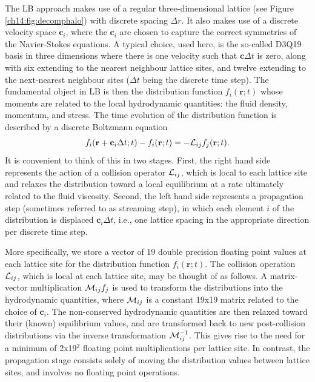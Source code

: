 The LB approach makes use of a regular three-dimensional
lattice (see Figure \ref{ch14:fig:decomphalo}) with discrete spacing
$\Delta r$. It also makes use of a
discrete velocity space $\mathbf{c}_i$, where the $\mathbf{c}_i$
are chosen to capture the correct symmetries of the Navier-Stokes
equations. A typical choice, used here, is the so-called D3Q19
basis in three dimensions where there is one velocity such that
$\mathbf{c} \Delta t$ is zero, along with six extending to the nearest
neighbour
lattice sites, and twelve extending to the next-nearest neighbour sites
($\Delta t$ being the discrete time step). The fundamental object
in LB is then the distribution function $f_i (\mathbf{r};t)$ whose
moments are related to the local hydrodynamic quantities: the fluid
density, momentum, and stress. The time evolution of the distribution
function is described by a discrete Boltzmann equation
\begin{equation}
f_i(\mathbf{r} + \mathbf{c}_i \Delta t; t) - f_i(\mathbf{r}; t) 
= - {\cal L}_{ij} f_j(\mathbf{r};t).
\end{equation}
It is convenient to think of this in two stages. First, the right hand
side represents the action of a collision operator ${\cal L}_{ij}$,
which is local to each lattice site and relaxes the distribution toward
a local equilibrium at a rate ultimately related to the fluid viscosity.
Second, the left hand side represents a propagation step (sometimes referred
to as streaming step), in which each element $i$ of the distribution is
displaced $\mathbf{c}_i \Delta t$, i.e., one lattice spacing in the
appropriate direction per discrete time step. 

More specifically, we store a vector of 19 double precision floating
point values at each lattice site for the distribution function
$f_i(\mathbf{r};t)$.
The collision operation ${\cal L}_{ij}$, which is local at each lattice
site, may be thought of as follows. A matrix-vector multiplication
${\cal M}_{ij}f_j$ is used to transform the distributions into the
hydrodynamic quantities, where ${\cal M}_{ij}$ is a constant 19x19
matrix related to the choice of
$\mathbf{c}_i$. The non-conserved hydrodynamic quantities are then
relaxed toward their (known) equilibrium values, and are transformed
back to new post-collision distributions via the inverse transformation
${\cal M}^{-1}_{ij}$. This gives rise to the need for a minimum of 2x19$^2$
floating point multiplications per lattice site. In contrast, the
propagation stage consists solely of moving the distribution values
between lattice sites, and involves no floating point operations.

